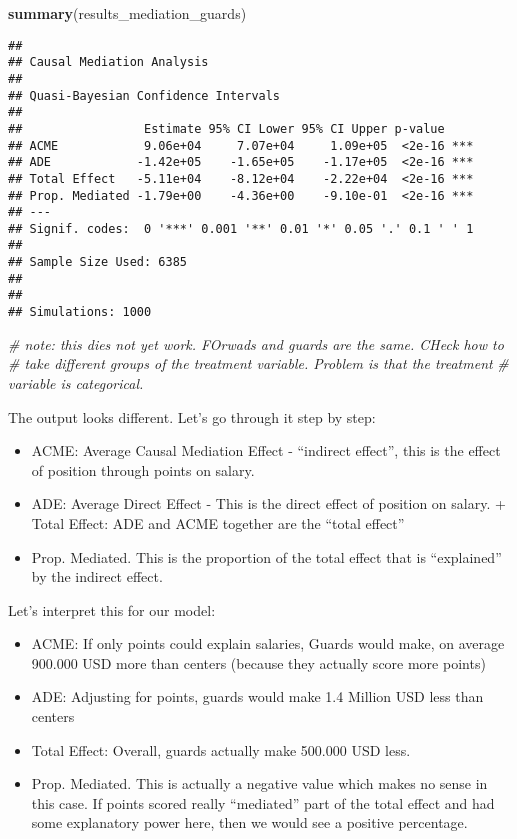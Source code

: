 \documentclass[
]{book}
\newenvironment{Shaded}{\begin{snugshade}}{\end{snugshade}}
\newcommand{\CommentTok}[1]{\textcolor[rgb]{0.56,0.35,0.01}{\textit{#1}}}
\newcommand{\FunctionTok}[1]{\textcolor[rgb]{0.13,0.29,0.53}{\textbf{#1}}}
\newcommand{\NormalTok}[1]{#1}
\providecommand{\tightlist}{%
  \setlength{\itemsep}{0pt}\setlength{\parskip}{0pt}}
\begin{document}
\begin{Shaded}
\begin{Highlighting}[]
\FunctionTok{summary}\NormalTok{(results\_mediation\_guards)}
\end{Highlighting}
\end{Shaded}

\begin{verbatim}
## 
## Causal Mediation Analysis 
## 
## Quasi-Bayesian Confidence Intervals
## 
##                 Estimate 95% CI Lower 95% CI Upper p-value    
## ACME            9.06e+04     7.07e+04     1.09e+05  <2e-16 ***
## ADE            -1.42e+05    -1.65e+05    -1.17e+05  <2e-16 ***
## Total Effect   -5.11e+04    -8.12e+04    -2.22e+04  <2e-16 ***
## Prop. Mediated -1.79e+00    -4.36e+00    -9.10e-01  <2e-16 ***
## ---
## Signif. codes:  0 '***' 0.001 '**' 0.01 '*' 0.05 '.' 0.1 ' ' 1
## 
## Sample Size Used: 6385 
## 
## 
## Simulations: 1000
\end{verbatim}

\begin{Shaded}
\begin{Highlighting}[]
\CommentTok{\# note: this dies not yet work. FOrwads and guards are the same. CHeck how to }
\CommentTok{\# take different groups of the treatment variable. Problem is that the treatment}
\CommentTok{\# variable is categorical.}
\end{Highlighting}
\end{Shaded}

The output looks different. Let's go through it step by step:

\begin{itemize}
\tightlist
\item
  ACME: Average Causal Mediation Effect - ``indirect effect'', this is the effect of position through points on salary.\\
\item
  ADE: Average Direct Effect - This is the direct effect of position on salary. + Total Effect: ADE and ACME together are the ``total effect''\\
\item
  Prop. Mediated. This is the proportion of the total effect that is ``explained'' by the indirect effect.
\end{itemize}

Let's interpret this for our model:

\begin{itemize}
\tightlist
\item
  ACME: If only points could explain salaries, Guards would make, on average 900.000 USD more than centers (because they actually score more points)
\item
  ADE: Adjusting for points, guards would make 1.4 Million USD less than centers
\item
  Total Effect: Overall, guards actually make 500.000 USD less.
\item
  Prop. Mediated. This is actually a negative value which makes no sense in this case. If points scored really ``mediated'' part of the total effect and had some explanatory power here, then we would see a positive percentage.
\end{itemize}
\end{document}
